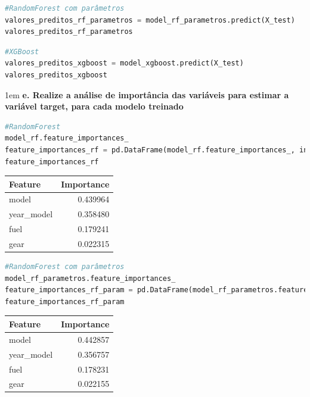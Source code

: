 \begin{lstlisting}[language=Python, style=input]
#RandomForest com parâmetros
valores_preditos_rf_parametros = model_rf_parametros.predict(X_test)
valores_preditos_rf_parametros
\end{lstlisting}

\begin{lstlisting}[language=Python, style=input]
#XGBoost
valores_preditos_xgboost = model_xgboost.predict(X_test)
valores_preditos_xgboost
\end{lstlisting}

\begin{adjustwidth}{1em}{}
\textbf{e. Realize a análise de importância das variáveis para estimar a variável target, \textbf{para cada modelo treinado}}
\end{adjustwidth}
\begin{lstlisting}[language=Python, style=input]
#RandomForest
model_rf.feature_importances_
feature_importances_rf = pd.DataFrame(model_rf.feature_importances_, index = X_train.columns, columns=['importance']).sort_values('importance', ascending = False)
feature_importances_rf 
\end{lstlisting}
\begin{table}[H]
\centering
\begin{tabular}{lr}
\hline
\textbf{Feature} & \textbf{Importance} \\
\hline
model      & 0.439964 \\
year\_model & 0.358480 \\
fuel       & 0.179241 \\
gear       & 0.022315 \\
\hline
\end{tabular}
\label{tab:feature_importance}
\end{table}


\begin{lstlisting}[language=Python, style=input]
#RandomForest com parâmetros
model_rf_parametros.feature_importances_
feature_importances_rf_param = pd.DataFrame(model_rf_parametros.feature_importances_, index = X_train.columns, columns=['importance']).sort_values('importance', ascending = False)
feature_importances_rf_param
\end{lstlisting}
\begin{table}[H]
\centering
\begin{tabular}{lr}
\hline
\textbf{Feature} & \textbf{Importance} \\
\hline
model       & 0.442857 \\
year\_model & 0.356757 \\
fuel        & 0.178231 \\
gear        & 0.022155 \\
\hline
\end{tabular}
\label{tab:updated_feature_importance}
\end{table}


